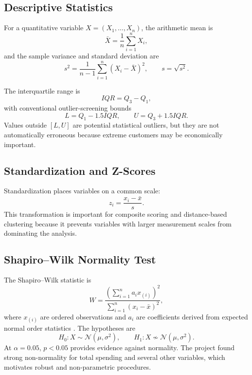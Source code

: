 \documentclass[11pt,a4paper]{article}
\begin{document}
\subsection{Descriptive Statistics}

For a quantitative variable $X=(X_1,\ldots,X_n)$, the arithmetic mean is
\begin{equation}
\bar X=\frac{1}{n}\sum_{i=1}^{n}X_i,
\end{equation}
and the sample variance and standard deviation are
\begin{equation}
s^2=\frac{1}{n-1}\sum_{i=1}^{n}(X_i-\bar X)^2,
\qquad
s=\sqrt{s^2}.
\end{equation}

The interquartile range is
\begin{equation}
IQR=Q_3-Q_1,
\end{equation}
with conventional outlier-screening bounds
\begin{equation}
L=Q_1-1.5IQR,\qquad U=Q_3+1.5IQR.
\end{equation}
Values outside $[L,U]$ are potential statistical outliers, but they are
not automatically erroneous because extreme customers may be economically
important.

\subsection{Standardization and Z-Scores}

Standardization places variables on a common scale:
\begin{equation}
z_i=\frac{x_i-\bar x}{s}.
\end{equation}
This transformation is important for composite scoring and distance-based
clustering because it prevents variables with larger measurement scales
from dominating the analysis.

\subsection{Shapiro--Wilk Normality Test}

The Shapiro--Wilk statistic is
\begin{equation}
W=
\frac{\left(\sum_{i=1}^{n}a_i x_{(i)}\right)^2}
{\sum_{i=1}^{n}(x_i-\bar{x})^2},
\end{equation}
where $x_{(i)}$ are ordered observations and $a_i$ are coefficients derived
from expected normal order statistics \cite{shapiro}. The hypotheses are
\begin{equation}
H_0:X\sim\mathcal N(\mu,\sigma^2),
\qquad
H_1:X\not\sim\mathcal N(\mu,\sigma^2).
\end{equation}
At $\alpha=0.05$, $p<0.05$ provides evidence against normality. The project
found strong non-normality for total spending and several other variables,
which motivates robust and non-parametric procedures.
\end{document}
